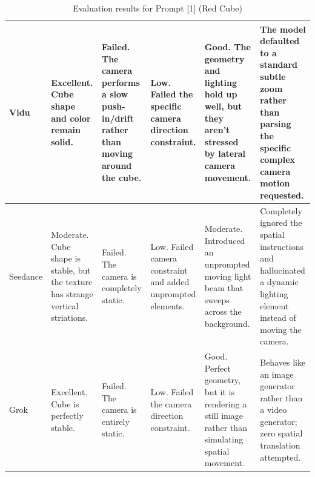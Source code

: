 \documentclass[sigconf]{acmart}
\begin{document}
\begin{table}[t]
\begin{tabularx}{\textwidth}{| l | >{\raggedright\arraybackslash}X | >{\raggedright\arraybackslash}X | >{\raggedright\arraybackslash}X | >{\raggedright\arraybackslash}X | >{\raggedright\arraybackslash}X |}
        Vidu           & Excellent. Cube shape and color remain solid.                                    & Failed. The camera performs a slow push-in/drift rather than moving around the cube. & Low. Failed the specific camera direction constraint.                                            & Good. The geometry and lighting hold up well, but they aren't stressed by lateral camera movement.    & The model defaulted to a standard subtle zoom rather than parsing the specific complex camera motion requested.                 \\ \hline
        Seedance       & Moderate. Cube shape is stable, but the texture has strange vertical striations. & Failed. The camera is completely static.                                             & Low. Failed camera constraint and added unprompted elements.                                     & Moderate. Introduced an unprompted moving light beam that sweeps across the background.               & Completely ignored the spatial instructions and hallucinated a dynamic lighting element instead of moving the camera.           \\ \hline
        Grok           & Excellent. Cube is perfectly stable.                                             & Failed. The camera is entirely static.                                               & Low. Failed the camera direction constraint.                                                     & Good. Perfect geometry, but it is rendering a still image rather than simulating spatial movement.    & Behaves like an image generator rather than a video generator; zero spatial translation attempted.                              \\ \hline
    \end{tabularx}
    \caption{Evaluation results for Prompt [1] (Red Cube)}
    \label{tab:eval_prompt_1}
\end{table}
\end{document}
